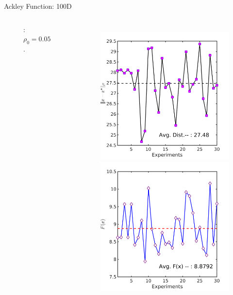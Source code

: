\documentclass{beamer}
\begin{document}
\begin{frame}{Ackley Function: 100D}
\begin{columns}[c]
\begin{figure}[!htbp]
	  \vspace{-0.2cm}
	  \footnotesize{ \caption{: $\rho_0=0.05$.} }
\end{figure}
\column{6cm} 
\begin{figure}[!htbp]
	\centering
	  \includegraphics[scale=0.1]{./figures/ackley100Drandr0_1_dist.png}
	  \includegraphics[scale=0.1]{./figures/ackley100Drandr0_1_val.png}

\end{figure}
\end{columns}
\end{frame}
\end{document}
